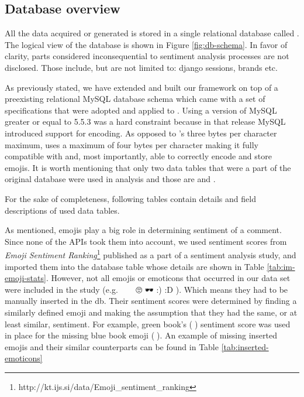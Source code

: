 \newcommand*{\DatabaseOverviewPath}{04-framework/02-implementation/01-database}

\subsection{Database overview\label{sec:database-overview}}
All the data acquired or generated is stored in a single relational database called . 
The logical view of the database is shown in Figure \ref{fig:db-schema}. 
In favor of clarity, parts considered inconsequential to sentiment analysis processes are not disclosed. 
Those include, but are not limited to: django sessions, brands etc.


As previously stated, we have extended and built our framework on top of a preexisting relational MySQL database schema which came with a set of specifications that were adopted and applied to .
Using a version of MySQL greater or equal to 5.5.3 was a hard constraint because in that release MySQL introduced support for  encoding.  
As opposed to 's three bytes per character maximum, 
 uses a maximum of four bytes per character making it fully compatible with  and, most importantly, able to correctly encode and store emojis.
It is worth mentioning that only two data tables that were a part of the original database were used in analysis and those are  and .

For the sake of completeness, following tables contain details and field descriptions of used data tables. 



\newpage

As mentioned, emojis play a big role in determining sentiment of a comment. 
Since none of the APIs took them into account, we used sentiment scores from \emph{Emoji Sentiment Ranking}\footnote{http://kt.ijs.si/data/Emoji\_sentiment\_ranking} published as a part of a sentiment analysis study\cite{Kralj2015emojis},  and imported them into the database table  whose details are shown in Table \ref{tab:im-emoji-stats}.  
However, not all emojis or emoticons that occurred in our data set were included in the study (e.g. 📘 🍾 🙂 🙄 🕶 :) :D ).
Which means they had to be manually inserted in the db. 
Their sentiment scores were determined by finding a similarly defined emoji and making the assumption that they had the same, or at least similar, sentiment. 
For example, green book's (📗) sentiment score was used in place for the missing blue book emoji (📘). 
An example of missing inserted emojis and their similar counterparts can be found in Table \ref{tab:inserted-emoticons}



